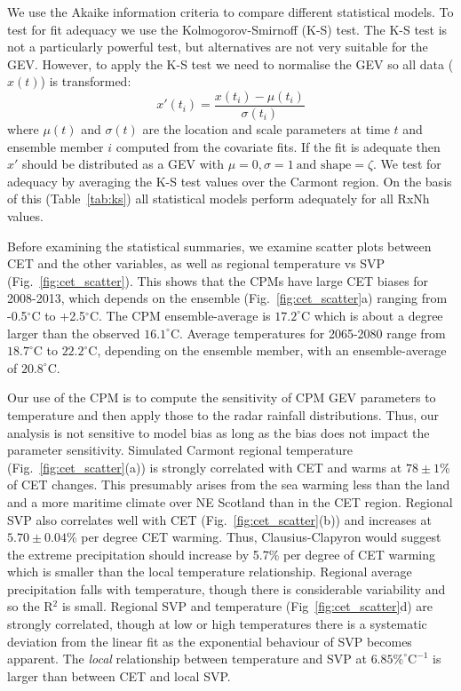 \documentclass[11pt,a4paper]{article}
\begin{document}
 We  use the Akaike information criteria\parencite{akaike74aic} to compare different statistical models. To test for fit adequacy we use the  Kolmogorov-Smirnoff (K-S) test. The K-S test is not a particularly powerful test\parencite{stephens74fit}, but alternatives are not very suitable for the GEV. However, to apply the K-S test we need to normalise the GEV so all data ($x(t)$) is transformed:
\begin{equation}
	x'(t_i)=\frac{x(t_i)-\mu(t_i)}{\sigma(t_i)}
\end{equation}
where $\mu(t)$ and $\sigma(t)$ are the location and scale parameters at time $t$ and ensemble member $i$ computed from the covariate fits. 
If the fit is adequate then $x'$ should be distributed as a GEV with $\mu=0, \sigma=1\ \text{and shape}=\zeta$. We test for adequacy by averaging the K-S test values over the Carmont region. On the basis of this (Table~\ref{tab:ks}) all statistical models perform adequately for all RxNh values.  


Before examining  the statistical summaries, we examine scatter plots between CET and the other variables, as well as regional temperature vs SVP (Fig.~\ref{fig:cet_scatter}). This shows that the CPMs have large CET biases for 2008-2013, which depends on the ensemble (Fig.~\ref{fig:cet_scatter}a) ranging from -0.5$^\circ$C to +2.5$^\circ$C. The CPM ensemble-average  is $17.2^\circ$C which is about a degree larger than the observed $16.1^\circ$C. Average temperatures for 2065-2080 range from $18.7^\circ$C to $22.2^\circ$C, depending on the ensemble member,  with an ensemble-average of  $20.8^\circ$C.

Our use of the CPM is to compute the sensitivity of CPM GEV parameters to temperature and then apply those to the radar rainfall distributions. Thus, our analysis is not sensitive to model bias as long as the bias does not impact the parameter sensitivity.  Simulated Carmont regional temperature (Fig.~\ref{fig:cet_scatter}(a)) is strongly correlated with CET and warms at $78\pm1$\% of CET changes. This presumably arises from the sea warming less than the land and a more maritime climate over NE Scotland than in the CET region. Regional SVP also correlates well with CET (Fig.~\ref{fig:cet_scatter}(b)) and increases at $5.70\pm 0.04$\% per degree CET warming. Thus, Clausius-Clapyron would suggest the extreme precipitation should increase by 5.7\% per degree of CET warming which is smaller than the local temperature relationship. Regional  average precipitation falls with temperature, though there is considerable variability and so the R$^2$ is small.  Regional SVP and temperature (Fig~\ref{fig:cet_scatter}d) are strongly correlated, though at low or high temperatures there is a systematic deviation from the linear fit as the exponential behaviour of SVP becomes apparent. The \textit{local} relationship between temperature and SVP at $6.85\%^\circ\text{C}^{-1}$ is larger than between CET and local SVP.  
 
\end{document}
